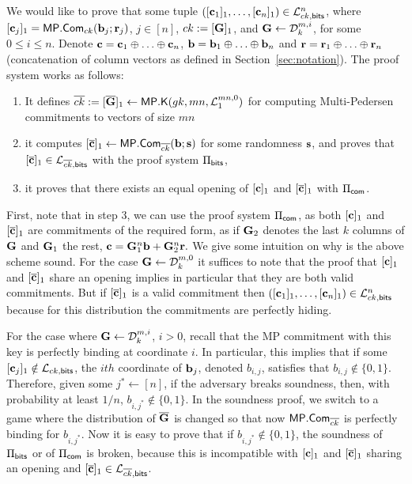 We would like to prove that some tuple
$([\mathbf{c}_1]_1,\ldots, [\mathbf{c}_n]_1) \in \mathcal{L}_{ck,\mathsf{bits}}^n$, where $[\mathbf{c}_j]_1=\mathsf{MP}.\mathsf{Com}_{ck}(\mathbf{b}_j;\mathbf{r}_j)$, $j \in [n]$, $ck:=[\mathbf{{G}}]_1$, and $\mathbf{{G}} \gets \mathcal{D}_k^{m,i}$, for some $0 \leq i \leq n$. 
Denote $\mathbf{c}=\mathbf{c}_1 \oplus \ldots \oplus \mathbf{c}_n$, $\mathbf{b}=\mathbf{b}_1 \oplus \ldots \oplus \mathbf{b}_n$ and $\mathbf{r}=\mathbf{r}_1 \oplus \ldots \oplus \mathbf{r}_n$ (concatenation of column vectors as defined in Section~\ref{sec:notation}). The proof system works as follows:
\begin{enumerate}
\item It defines  
 $\overline{ck}:=[\overline{\mathbf{{G}}}]_1\gets\mathsf{MP}.\mathsf{K}(gk,mn,\mathcal{L}_{1}^{mn,0})$ for computing Multi-Pedersen commitments to vectors of size $mn$

\item it computes $[{\overline{\mathbf{c}}}]_1\gets\mathsf{MP}.\mathsf{Com}_{\overline{ck}}(\mathbf{b};\mathbf{s})$ for some 
randomness $\mathbf{s}$, and proves that $[{\overline{\mathbf{c}}}]_1\in\mathcal{L}_{\overline{ck},\mathsf{bits}}$ with the proof system $\Pi_{\mathsf{bits}}$,
\item it  proves that there exists an equal opening of $[\mathbf{c}]_1$ and $[{\overline{\mathbf{c}}}]_1$ with  $\Pi_{\mathsf{com}}$.
\end{enumerate}
First, note that in step 3, we can use the proof system $\Pi_{\mathsf{com}}$, as both $[\mathbf{c}]_1$ and $[{\overline{\mathbf{c}}}]_1$ are commitments of the required form, as if $\mathbf{{G}}_2$ denotes the last $k$ columns 
of $\mathbf{{G}}$ and $\mathbf{{G}}_1$ the rest,
$\mathbf{c}=\mathbf{{G}}_1^n\mathbf{b}+\mathbf{{G}}_2^n\mathbf{r}.
$
We give some intuition on why is the above scheme sound. For the case $\mathbf{{G}} \gets \mathcal{D}_k^{m,0}$ it suffices to note that the proof that  $[\mathbf{c}]_1$ and $[{\overline{\mathbf{c}}}]_1$ share an opening implies in particular that they are both valid commitments. But if 
$[{\overline{\mathbf{c}}}]_1$ is a valid commitment then $([\mathbf{c}_1]_1,\ldots, [\mathbf{c}_n]_1) \in \mathcal{L}_{ck,\mathsf{bits}}^n$ because for this distribution the commitments are perfectly hiding. 

For the case where $\mathbf{{G}} \gets \mathcal{D}_k^{m,i}$, $i>0$, 
recall that the MP commitment with this key is 
perfectly binding at coordinate $i$. In particular, this implies that if some $[\mathbf{c}_j]_1 \notin \mathcal{L}_{ck,\mathsf{bits}}$, the $ith$ coordinate of $\mathbf{b}_j$, denoted $b_{i,j}$, satisfies that $b_{i,j} \notin \{0,1\}$. Therefore, given some $j^* \gets [n]$, if the adversary breaks soundness, then, with probability at least $1/n$, $b_{i,j^*} \notin \{0,1\}$. In the soundness proof, we switch to a game where the distribution of $\overline{\mathbf{{G}}}$ is changed so that now 
$\mathsf{MP}.\mathsf{Com}_{\overline{ck}}$ is perfectly binding for $b_{i,j^*}$. Now it is easy to prove that if $b_{i,j^*} \notin \{0,1\}$, the soundness of $\Pi_{\mathsf{bits}}$ or of $\Pi_{\mathsf{com}}$ is broken, because this is incompatible with $[\mathbf{c}]_1$ and $[{\overline{\mathbf{c}}}]_1$ sharing an opening and $[{\overline{\mathbf{c}}}]_1 \in\mathcal{L}_{\overline{ck},\mathsf{bits}}$.

